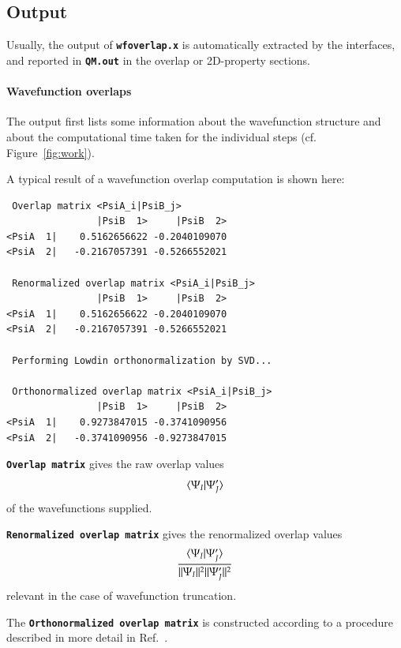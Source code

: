 \documentclass[a4paper,10pt,DIV=15,openany]{scrbook}
\newcommand{\ttt}[1]{\textbf{\texttt{#1}}}
\newenvironment{example}{
  \setlength{\OuterFrameSep}{3pt}
  \vspace{0mm}
  \definecolor{shadecolor}{HTML}{E4F4FF}
  \begin{shaded}
}{
  \end{shaded}
}
\begin{document}
\subsection{Output}

Usually, the output of \ttt{wfoverlap.x} is automatically extracted by the interfaces, and reported in \ttt{QM.out} in the overlap or 2D-property sections.

\paragraph{Wavefunction overlaps}

The output first lists some information about the wavefunction structure and about the computational time taken for the individual steps (cf. Figure~\ref{fig:work}).

A typical result of a wavefunction overlap computation is shown here:
\begin{example}
\begin{verbatim}
 Overlap matrix <PsiA_i|PsiB_j>
                |PsiB  1>     |PsiB  2>
<PsiA  1|    0.5162656622 -0.2040109070
<PsiA  2|   -0.2167057391 -0.5266552021

 Renormalized overlap matrix <PsiA_i|PsiB_j>
                |PsiB  1>     |PsiB  2>
<PsiA  1|    0.5162656622 -0.2040109070
<PsiA  2|   -0.2167057391 -0.5266552021

 Performing Lowdin orthonormalization by SVD...

 Orthonormalized overlap matrix <PsiA_i|PsiB_j>
                |PsiB  1>     |PsiB  2>
<PsiA  1|    0.9273847015 -0.3741090956
<PsiA  2|   -0.3741090956 -0.9273847015
\end{verbatim}
\end{example}

\ttt{Overlap matrix} gives the raw overlap values
\begin{equation}
  \braket{\Psi_I|\Psi_J'}
\end{equation}
of the wavefunctions supplied.

\ttt{Renormalized overlap matrix} gives the renormalized overlap values
\begin{equation}
  \frac{  \braket{\Psi_I|\Psi_J'}  }{  ||\Psi_I||^2  ||\Psi_J'||^2}
\end{equation}
relevant in the case of wavefunction truncation.

The \ttt{Orthonormalized overlap matrix} is constructed according to a procedure described in more detail in Ref.~\cite{Plasser2016JCTC}.
\end{document}
